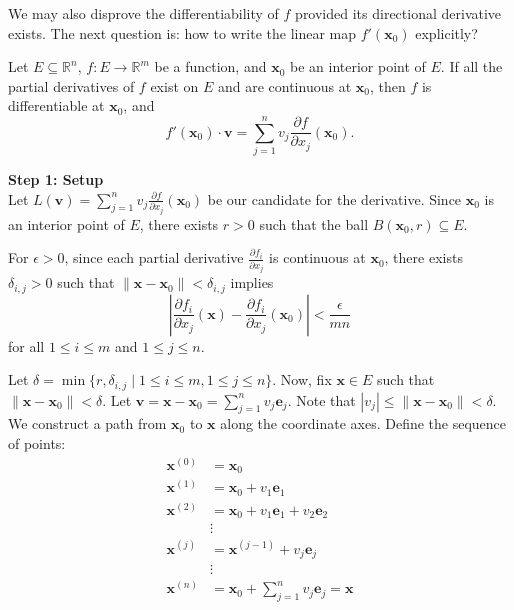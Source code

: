 \documentclass[12pt]{article}
\begin{document}
We may also disprove the differentiability of $f$ provided its directional derivative exists.
The next question is: how to write the linear map $f'(\mathbf{x}_0)$ explicitly?

\begin{theorem}
Let $E \subseteq \mathbb{R}^n$, $f: E \to \mathbb{R}^m$ be a function, and $\mathbf{x}_0$ be an interior point of $E$.
If all the partial derivatives of $f$ exist on $E$ and are continuous at $\mathbf{x}_0$, then $f$ is differentiable at $\mathbf{x}_0$, and
$$f'(\mathbf{x}_0)\cdot\mathbf{v} = \sum_{j=1}^n v_j \frac{\partial f}{\partial x_j}(\mathbf{x}_0).$$
\end{theorem}


\begin{dbox}
\begin{pf}
\noindent \textbf{Step 1: Setup}\\
Let $L(\mathbf{v}) = \sum_{j=1}^n v_j \frac{\partial f}{\partial x_j}(\mathbf{x}_0)$ be our candidate for the derivative.
Since $\mathbf{x}_0$ is an interior point of $E$, there exists $r > 0$ such that the ball $B(\mathbf{x}_0, r) \subseteq E$.

For $\epsilon > 0$, since each partial derivative $\frac{\partial f_i}{\partial x_j}$ is continuous at $\mathbf{x}_0$, there exists $\delta_{i,j} > 0$ such that $\|\mathbf{x} - \mathbf{x}_0\| < \delta_{i,j}$ implies
$$\left| \frac{\partial f_i}{\partial x_j}(\mathbf{x}) - \frac{\partial f_i}{\partial x_j}(\mathbf{x}_0) \right| < \frac{\epsilon}{mn}$$
for all $1 \le i \le m$ and $1 \le j \le n$.

Let $\delta = \min\{r, \delta_{i,j} \mid 1 \le i \le m, 1\le j \le n\}$.
Now, fix $\mathbf{x} \in E$ such that $\|\mathbf{x} - \mathbf{x}_0\| < \delta$. Let $\mathbf{v} = \mathbf{x} - \mathbf{x}_0 = \sum_{j=1}^n v_j \mathbf{e}_j$. Note that $|v_j| \le \|\mathbf{x} - \mathbf{x}_0\| < \delta$.
We construct a path from $\mathbf{x}_0$ to $\mathbf{x}$ along the coordinate axes. Define the sequence of points:
\begin{align*}
\mathbf{x}^{(0)} &= \mathbf{x}_0 \\
\mathbf{x}^{(1)} &= \mathbf{x}_0 + v_1 \mathbf{e}_1 \\
\mathbf{x}^{(2)} &= \mathbf{x}_0 + v_1 \mathbf{e}_1 + v_2 \mathbf{e}_2 \\
&\vdots \\
\mathbf{x}^{(j)} &= \mathbf{x}^{(j-1)} + v_j \mathbf{e}_j \\
&\vdots \\
\mathbf{x}^{(n)} &= \mathbf{x}_0 + \sum_{j=1}^n v_j \mathbf{e}_j = \mathbf{x}
\end{align*}


\end{pf}
\end{dbox}
\end{document}
